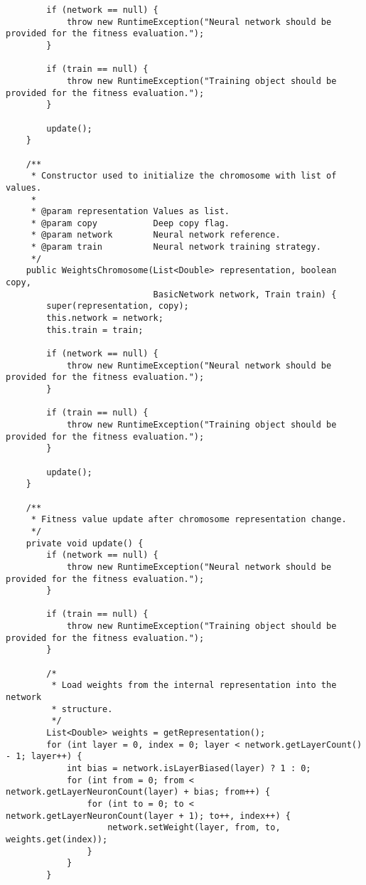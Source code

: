 \begin{verbatim}
        if (network == null) {
            throw new RuntimeException("Neural network should be provided for the fitness evaluation.");
        }

        if (train == null) {
            throw new RuntimeException("Training object should be provided for the fitness evaluation.");
        }

        update();
    }

    /**
     * Constructor used to initialize the chromosome with list of values.
     *
     * @param representation Values as list.
     * @param copy           Deep copy flag.
     * @param network        Neural network reference.
     * @param train          Neural network training strategy.
     */
    public WeightsChromosome(List<Double> representation, boolean copy,
                             BasicNetwork network, Train train) {
        super(representation, copy);
        this.network = network;
        this.train = train;

        if (network == null) {
            throw new RuntimeException("Neural network should be provided for the fitness evaluation.");
        }

        if (train == null) {
            throw new RuntimeException("Training object should be provided for the fitness evaluation.");
        }

        update();
    }

    /**
     * Fitness value update after chromosome representation change.
     */
    private void update() {
        if (network == null) {
            throw new RuntimeException("Neural network should be provided for the fitness evaluation.");
        }

        if (train == null) {
            throw new RuntimeException("Training object should be provided for the fitness evaluation.");
        }

        /*
         * Load weights from the internal representation into the network
         * structure.
         */
        List<Double> weights = getRepresentation();
        for (int layer = 0, index = 0; layer < network.getLayerCount() - 1; layer++) {
            int bias = network.isLayerBiased(layer) ? 1 : 0;
            for (int from = 0; from < network.getLayerNeuronCount(layer) + bias; from++) {
                for (int to = 0; to < network.getLayerNeuronCount(layer + 1); to++, index++) {
                    network.setWeight(layer, from, to, weights.get(index));
                }
            }
        }


\end{verbatim}
